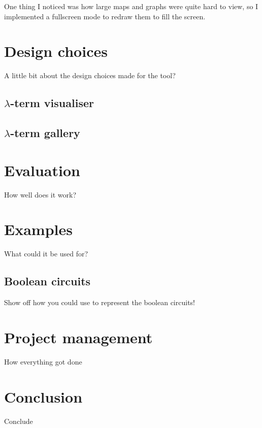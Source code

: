 \documentclass[11pt]{article}
\begin{document}
One thing I noticed was how large maps and graphs were quite hard to view, so I implemented a fullscreen mode to redraw them to fill the screen.

\newpage

\section{Design choices}
\label{sec:design}
A little bit about the design choices made for the tool?

\subsection{\texorpdfstring{$\lambda$}{Lambda}-term visualiser}


\subsection{\texorpdfstring{$\lambda$}{Lambda}-term gallery}


\newpage
\section{Evaluation}
\label{sec:evaluation}
How well does it work?

\newpage
\section{Examples}
What could it be used for?

\subsection{Boolean circuits}
Show off how you could use to represent the boolean circuits!

\newpage

\section{Project management}
\label{sec:project-management}
How everything got done

\newpage
\section{Conclusion}
\label{sec:conclusion}
Conclude

\newpage


\end{document}
